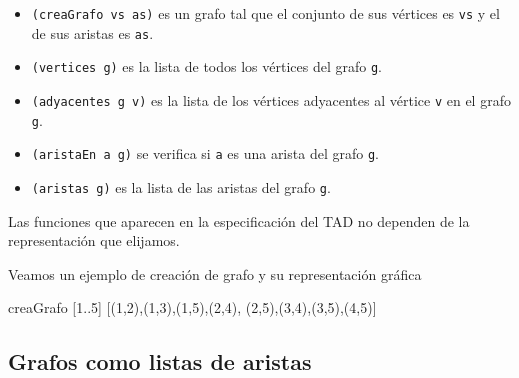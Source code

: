 \begin{itemize}
\item \texttt{(creaGrafo vs as)} es un grafo tal que el conjunto de sus
  vértices  es \texttt{vs} y el de sus aristas es \texttt{as}.
\item \texttt{(vertices g)} es la lista de todos los vértices del grafo \texttt{g}.
\item \texttt{(adyacentes g v)} es la lista de los vértices adyacentes al vértice
  \texttt{v} en el grafo \texttt{g}.
\item \texttt{(aristaEn a g)} se verifica si \texttt{a} es una arista del grafo
  \texttt{g}.
\item \texttt{(aristas g)} es la lista de las aristas del grafo \texttt{g}.
\end{itemize}

\begin{nota}
  Las funciones que aparecen en la especificación del TAD no dependen 
  de la representación que elijamos.
\end{nota}

\begin{ejemplo}

Veamos un ejemplo de creación de grafo y su representación gráfica

\begin{code}
creaGrafo [1..5] [(1,2),(1,3),(1,5),(2,4),
                  (2,5),(3,4),(3,5),(4,5)]
\end{code}

\begin{center}
\end{center}
\end{ejemplo}

\subsection{Grafos como listas de aristas}


